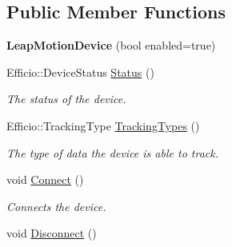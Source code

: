 \subsection*{Public Member Functions}
\begin{DoxyCompactItemize}
\item 
{\bfseries Leap\+Motion\+Device} (bool enabled=true)\hypertarget{class_efficio_1_1_leap_motion_device_a4c7db230fdb484f9b97ca95328e43f49}{}\label{class_efficio_1_1_leap_motion_device_a4c7db230fdb484f9b97ca95328e43f49}

\item 
Efficio\+::\+Device\+Status \hyperlink{class_efficio_1_1_leap_motion_device_aa8da27f1e5cbd65e88534f15df701914}{Status} ()\hypertarget{class_efficio_1_1_leap_motion_device_aa8da27f1e5cbd65e88534f15df701914}{}\label{class_efficio_1_1_leap_motion_device_aa8da27f1e5cbd65e88534f15df701914}

\begin{DoxyCompactList}\small\item\em The status of the device. \end{DoxyCompactList}\item 
Efficio\+::\+Tracking\+Type \hyperlink{class_efficio_1_1_leap_motion_device_a6234ba513473646dd7bf779d13e6c8ef}{Tracking\+Types} ()\hypertarget{class_efficio_1_1_leap_motion_device_a6234ba513473646dd7bf779d13e6c8ef}{}\label{class_efficio_1_1_leap_motion_device_a6234ba513473646dd7bf779d13e6c8ef}

\begin{DoxyCompactList}\small\item\em The type of data the device is able to track. \end{DoxyCompactList}\item 
void \hyperlink{class_efficio_1_1_leap_motion_device_a72bff092872814da4aec665b1fb09b5f}{Connect} ()\hypertarget{class_efficio_1_1_leap_motion_device_a72bff092872814da4aec665b1fb09b5f}{}\label{class_efficio_1_1_leap_motion_device_a72bff092872814da4aec665b1fb09b5f}

\begin{DoxyCompactList}\small\item\em Connects the device. \end{DoxyCompactList}\item 
void \hyperlink{class_efficio_1_1_leap_motion_device_aabe3f50f1a03994d5fd91d8aec615ff6}{Disconnect} ()\hypertarget{class_efficio_1_1_leap_motion_device_aabe3f50f1a03994d5fd91d8aec615ff6}{}\label{class_efficio_1_1_leap_motion_device_aabe3f50f1a03994d5fd91d8aec615ff6}


\end{DoxyCompactItemize}
